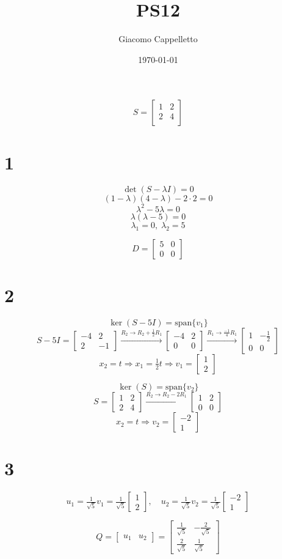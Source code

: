 \documentclass{article}
\title{PS12}
\author{Giacomo Cappelletto}
\date{\today}
\newcommand{\mat}[1]{\begin{bmatrix}#1\end{bmatrix}}
\newcommand{\il}[1]{\[#1\]}
\begin{document}
\maketitle

\il{
  S = 
  \mat{
    1 & 2 \\
    2 & 4 \\
  }
}

\section*{1}

\il{\det(S - \lambda I) = 0}
\il{(1 - \lambda)(4 - \lambda) - 2\cdot2 = 0}
\il{\lambda^2 - 5\lambda = 0}
\il{\lambda(\lambda - 5) = 0}
\il{\lambda_1 = 0,\; \lambda_2 = 5}

\il{D = \mat{5 & 0 \\ 0 & 0}}

\section*{2}

\il{\ker(S - 5I) = \mathrm{span}\{v_1\}}
\il{
  S - 5I = \mat{-4 & 2 \\ 2 & -1}
  \xrightarrow{R_2\to R_2 + \tfrac12R_1}
  \mat{-4 & 2 \\ 0 & 0}
  \xrightarrow{R_1\to \tfrac{-1}{4}R_1}
  \mat{1 & -\tfrac12 \\ 0 & 0}
}
\il{x_2 = t \Rightarrow x_1 = \tfrac12t \Rightarrow v_1 = \mat{1 \\ 2}}

\il{\ker(S) = \mathrm{span}\{v_2\}}
\il{
  S = \mat{1 & 2 \\ 2 & 4}
  \xrightarrow{R_2\to R_2 - 2R_1}
  \mat{1 & 2 \\ 0 & 0}
}
\il{x_2 = t \Rightarrow v_2 = \mat{-2 \\ 1}}

\section*{3}

\il{u_1 = \tfrac{1}{\sqrt5}v_1 = \tfrac{1}{\sqrt5}\mat{1\\2},\quad u_2 = \tfrac{1}{\sqrt5}v_2 = \tfrac{1}{\sqrt5}\mat{-2\\1}}

\il{Q = \begin{bmatrix}u_1 & u_2\end{bmatrix} = \mat{\tfrac{1}{\sqrt5} & -\tfrac{2}{\sqrt5}\\[4pt]\tfrac{2}{\sqrt5} & \tfrac{1}{\sqrt5}}}
\end{document}
